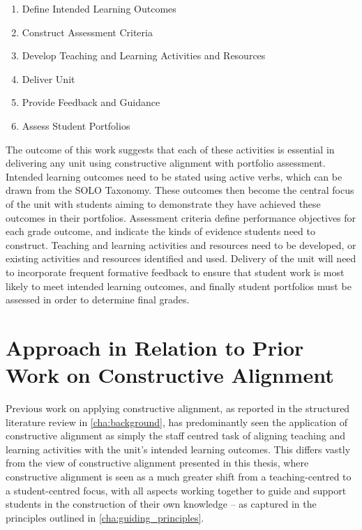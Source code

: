 \begin{enumerate}
	\item Define Intended Learning Outcomes
	\item Construct Assessment Criteria
	\item Develop Teaching and Learning Activities and Resources
	\item Deliver Unit
	\item Provide Feedback and Guidance
	\item Assess Student Portfolios
\end{enumerate}

The outcome of this work suggests that each of these activities is essential in delivering any unit using constructive alignment with portfolio assessment. Intended learning outcomes need to be stated using active verbs, which can be drawn from the SOLO Taxonomy. These outcomes then become the central focus of the unit with students aiming to demonstrate they have achieved these outcomes in their portfolios. Assessment criteria define performance objectives for each grade outcome, and indicate the kinds of evidence students need to construct. Teaching and learning activities and resources need to be developed, or existing activities and resources identified and used. Delivery of the unit will need to incorporate frequent formative feedback to ensure that student work is most likely to meet intended learning outcomes, and finally student portfolios must be assessed in order to determine final grades. 



\section{Approach in Relation to Prior Work on Constructive Alignment} %
\label{sec:approach_in_relation_to_previous_work}

Previous work on applying constructive alignment, as reported in the structured literature review in \cref{cha:background}, has predominantly seen the application of constructive alignment as simply the staff centred task of aligning teaching and learning activities with the unit's intended learning outcomes. This differs vastly from the view of constructive alignment presented in this thesis, where constructive alignment is seen as a much greater shift from a teaching-centred to a student-centred focus, with all aspects working together to guide and support students in the construction of their own knowledge -- as captured in the principles outlined in \cref{cha:guiding_principles}.

